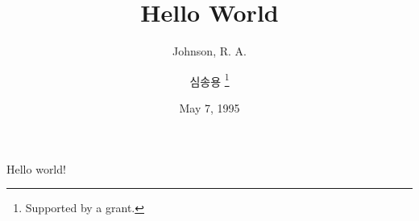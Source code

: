 \documentclass[11pt]{article}
\title{Hello World}
\author{Johnson, R. A. \and 심송용 \thanks{Supported by a grant.}}
\date{May 7, 1995}
\begin{document}
\maketitle

Hello world!
\end{document}
